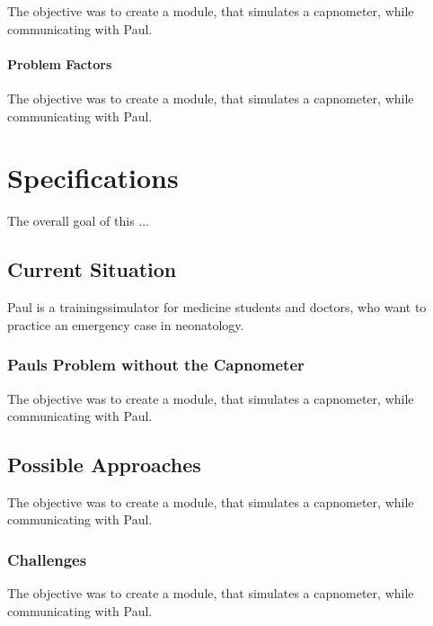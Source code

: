 \documentclass[12pt]{article}
\begin{document}
The objective was to create a module, that simulates a capnometer, while communicating
with Paul.


\paragraph{Problem Factors}

The objective was to create a module, that simulates a capnometer, while communicating
with Paul.


\clearpage



\section{Specifications}

The overall goal of this ...


\subsection{Current Situation}

Paul is a trainingssimulator for medicine students and doctors, who want to practice
an emergency case in neonatology.


\subsubsection{Pauls Problem without the Capnometer}

The objective was to create a module, that simulates a capnometer, while communicating
with Paul.


\subsection{Possible Approaches}

The objective was to create a module, that simulates a capnometer, while communicating
with Paul.


\subsubsection{Challenges}

The objective was to create a module, that simulates a capnometer, while communicating
with Paul.
\end{document}
